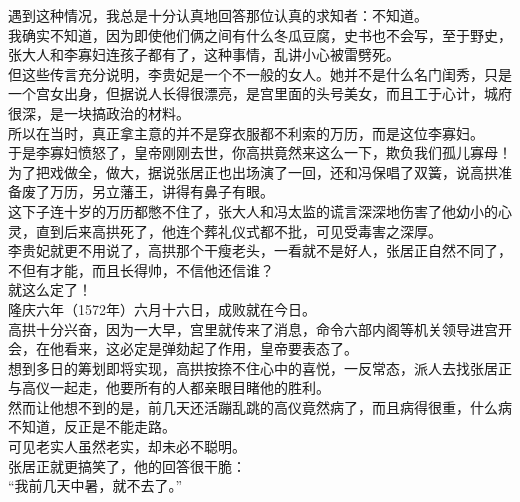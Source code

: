 \begin{multicols}{\theparacolNo}
遇到这种情况，我总是十分认真地回答那位认真的求知者：不知道。\\

我确实不知道，因为即使他们俩之间有什么冬瓜豆腐，史书也不会写，至于野史，张大人和李寡妇连孩子都有了，这种事情，乱讲小心被雷劈死。\\

但这些传言充分说明，李贵妃是一个不一般的女人。她并不是什么名门闺秀，只是一个宫女出身，但据说人长得很漂亮，是宫里面的头号美女，而且工于心计，城府很深，是一块搞政治的材料。\\

所以在当时，真正拿主意的并不是穿衣服都不利索的万历，而是这位李寡妇。\\

于是李寡妇愤怒了，皇帝刚刚去世，你高拱竟然来这么一下，欺负我们孤儿寡母！\\

为了把戏做全，做大，据说张居正也出场演了一回，还和冯保唱了双簧，说高拱准备废了万历，另立藩王，讲得有鼻子有眼。\\

这下子连十岁的万历都憋不住了，张大人和冯太监的谎言深深地伤害了他幼小的心灵，直到后来高拱死了，他连个葬礼仪式都不批，可见受毒害之深厚。\\

李贵妃就更不用说了，高拱那个干瘦老头，一看就不是好人，张居正自然不同了，不但有才能，而且长得帅，不信他还信谁？\\

就这么定了！\\

隆庆六年（1572年）六月十六日，成败就在今日。\\

高拱十分兴奋，因为一大早，宫里就传来了消息，命令六部内阁等机关领导进宫开会，在他看来，这必定是弹劾起了作用，皇帝要表态了。\\

想到多日的筹划即将实现，高拱按捺不住心中的喜悦，一反常态，派人去找张居正与高仪一起走，他要所有的人都亲眼目睹他的胜利。\\

然而让他想不到的是，前几天还活蹦乱跳的高仪竟然病了，而且病得很重，什么病不知道，反正是不能走路。\\

可见老实人虽然老实，却未必不聪明。\\

张居正就更搞笑了，他的回答很干脆：\\

“我前几天中暑，就不去了。”\\


\end{multicols}
